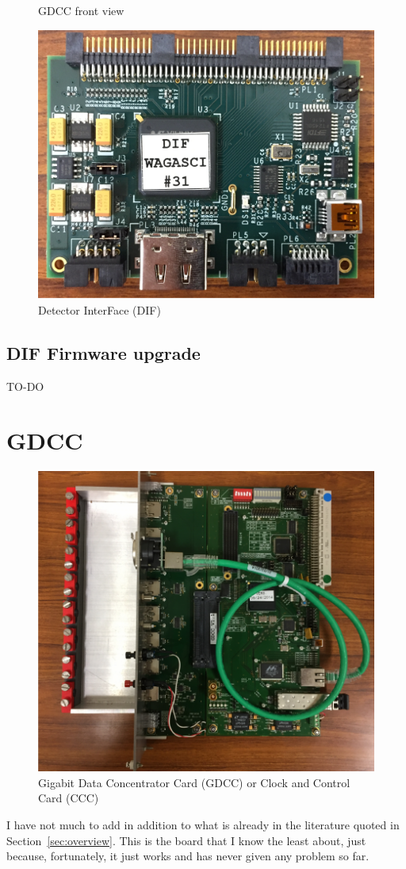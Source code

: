 \begin{figure}[H]
\begin{minipage}{0.2\linewidth}
    \caption{GDCC front view}\label{fig:GDCC-front-view}
  \end{minipage}%
  \begin{minipage}{0.7\linewidth}
    \centering \includegraphics[width=0.9\linewidth, frame]{DIF}
    \caption{Detector InterFace (DIF)}
  \end{minipage}
\end{figure}

\subsection{DIF Firmware upgrade}

TO-DO

\section{GDCC}
\begin{figure}[ht]
  \centering \includegraphics[width=0.7\linewidth, frame]{GDCC}
  \caption{Gigabit Data Concentrator Card (GDCC) or Clock and Control Card
    (CCC)}
\end{figure}
I have not much to add in addition to what is already in the literature quoted
in Section~\ref{sec:overview}. This is the board that I know the least about,
just because, fortunately, it just works and has never given any problem so far.

